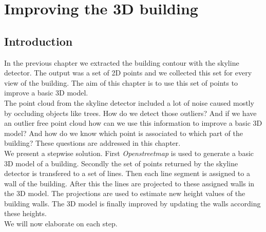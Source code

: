 








\section{Improving the 3D building}
\subsection{Introduction}
In the previous chapter we extracted the building contour with the skyline
detector. The output was a set of 2D points and we collected this set for every
view of the building.  The aim of this chapter is to use this set of points to
improve a basic 3D model. \\
The point cloud from the skyline detector included a lot of noise caused mostly
by occluding objects like trees. How do we detect those outliers?
And if we have an outlier free point cloud how can we use this information to
improve a basic 3D model? And how do we know which point is associated to which part of the
building?  These questions are addressed in this chapter.\\
We present a stepwise solution. First \emph{Openstreetmap} is used to generate
a basic 3D model of a building. Secondly the set of points returned by the
skyline detector is transfered to a set of lines. Then each line segment is
assigned to a wall of the building. After this the lines are projected to these
assigned walls in the 3D model.  The projections are used to estimate new
height values of the building walls.  The 3D model is finally improved by updating the
walls according these heights. \\
We will now elaborate on each step.\\

